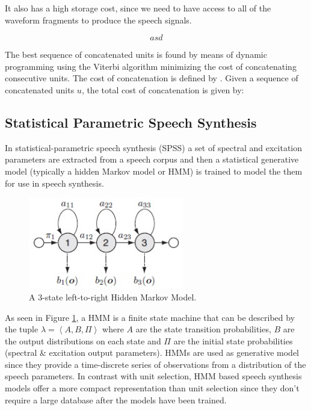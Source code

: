 It also has a high storage cost, since we need to have access to all of the waveform fragments to produce the speech signals.

\begin{equation}
    asd
    \label{eq:units}
\end{equation}

The best sequence of concatenated units is found by means of dynamic programming using the Viterbi algorithm minimizing the cost of concatenating consecutive units. The cost of concatenation is defined by \cite{unit-cost}. Given a sequence of concatenated units $u$, the total cost of concatenation is given by:

\subsection{Statistical Parametric Speech Synthesis}

In statistical-parametric speech synthesis (SPSS) a set of spectral and excitation parameters are extracted from a speech corpus and then a statistical generative model (typically a hidden Markov model or HMM) is trained to model the them for use in speech synthesis.

\begin{figure}[h]
    \centering
    \includegraphics[height=4cm]{figures/hmm}
    \caption{A 3-state left-to-right Hidden Markov Model.}
    \label{fig:hmm}
\end{figure}

As seen in Figure \ref{fig:hmm}, a HMM is a finite state machine that can be described by the tuple $\lambda = \left < A, B, \Pi \right >$ where $A$ are the state transition probabilities, $B$ are the output distributions on each state and $\Pi$ are the initial state probabilities (spectral \& excitation output parameters). HMMs are used as generative model since they provide a time-discrete series of observations from a distribution of the speech parameters. In contrast with unit selection, HMM based speech synthesis models offer a more compact representation than unit selection since they don't require a large database after the models have been trained.

